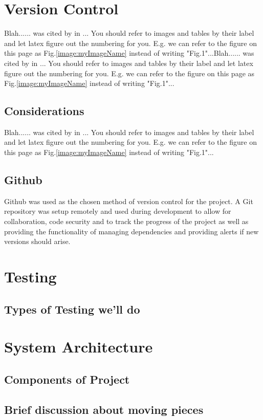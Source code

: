 \section{Version Control}
Blah...... was cited by \cite{MEAN_STACK} in ... You should refer to images and tables by their label and let latex figure out the numbering for you. E.g. we can refer to the figure on this page as Fig.\ref{image:myImageName} instead of writing "Fig.1"...Blah...... was cited by \cite{MEAN_STACK} in ... You should refer to images and tables by their label and let latex figure out the numbering for you. E.g. we can refer to the figure on this page as Fig.\ref{image:myImageName} instead of writing "Fig.1"...
\subsection{Considerations}
Blah...... was cited by \cite{MEAN_STACK} in ... You should refer to images and tables by their label and let latex figure out the numbering for you. E.g. we can refer to the figure on this page as Fig.\ref{image:myImageName} instead of writing "Fig.1"...

\subsection{Github}

Github was used as the chosen method of version control for the project. A Git repository was setup remotely and used during development to allow for collaboration, code security and to track the progress of the project as well as providing the functionality of managing dependencies and providing alerts if new versions should arise. 




\section{Testing}
\subsection{Types of Testing we'll do}

\section{System Architecture}
\subsection{Components of Project}
\subsection{Brief discussion about moving pieces}


